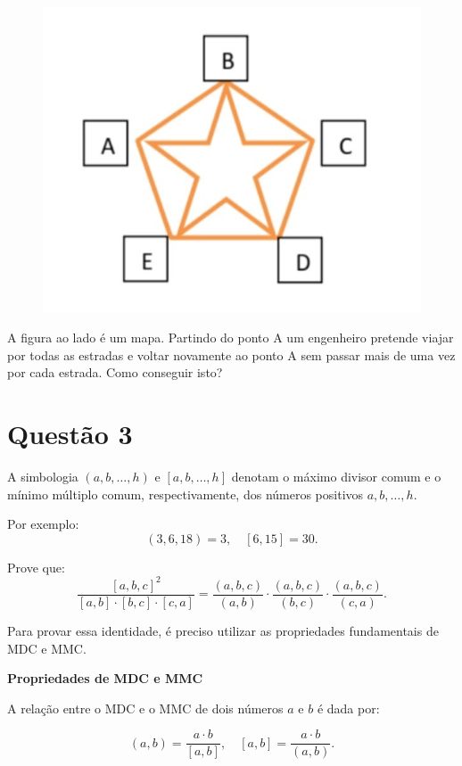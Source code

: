 \begin{figure}
    \centering
    \includegraphics[width=0.5\linewidth]{Textuais/imagem.jpg}
    \caption{}
    \label{fig:enter-label}
\end{figure}
A figura ao lado é um mapa. Partindo do ponto A um engenheiro pretende viajar por todas as estradas e voltar novamente ao ponto A sem passar mais de uma vez por cada estrada. Como conseguir isto?

\vspace{10pt}



\section*{Questão 3}

A simbologia \((a, b, \dots, h)\) e \([a, b, \dots, h]\) denotam o máximo divisor comum e o mínimo múltiplo comum, respectivamente, dos números positivos \(a, b, \dots, h\). 

Por exemplo:
\[
(3,6,18) = 3, \quad [6,15] = 30.
\]

Prove que:
\[
\frac{[a,b,c]^2}{[a,b] \cdot [b,c] \cdot [c,a]} = \frac{(a,b,c)}{(a,b)} \cdot \frac{(a,b,c)}{(b,c)} \cdot \frac{(a,b,c)}{(c,a)}.
\]

Para provar essa identidade, é preciso utilizar as propriedades fundamentais de MDC e MMC.

\vspace{10pt}

\textbf{Propriedades de MDC e MMC}

A relação entre o MDC e o MMC de dois números \(a\) e \(b\) é dada por:

\[
(a, b) = \frac{a \cdot b}{[a, b]}, \quad [a, b] = \frac{a \cdot b}{(a, b)}.
\]

